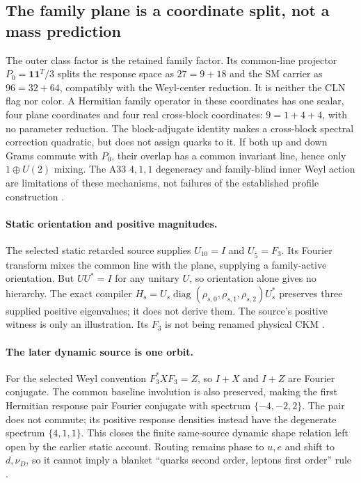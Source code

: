 \documentclass[11pt]{article}
\begin{document}
\subsection{The family plane is a coordinate split, not a mass prediction}
\label{sec:fsb04c}
The outer class factor is the retained family factor. Its common-line
projector $P_0=\mathbf1\mathbf1^T/3$ splits the response space as $27=9+18$
and the SM carrier as $96=32+64$, compatibly with the Weyl-center reduction.
It is neither the CLN flag nor color. A Hermitian family operator in these
coordinates has one scalar, four plane coordinates and four real cross-block
coordinates: $9=1+4+4$, with no parameter reduction. The block-adjugate
identity makes a cross-block spectral correction quadratic, but does not
assign quarks to it. If both up and down Grams commute with $P_0$, their
overlap has a common invariant line, hence only $1\oplus U(2)$ mixing. The
A33 $4,1,1$ degeneracy and family-blind inner Weyl action are limitations of
these mechanisms, not failures of the established profile construction
\cite{FSB04c}.

\paragraph{Static orientation and positive magnitudes.}\label{sec:fsb04d}
The selected static retarded source supplies $U_{10}=I$ and
$U_{\overline5}=F_3$. Its Fourier transform mixes the common line with the
plane, supplying a family-active orientation. But $UU^*=I$ for any unitary
$U$, so orientation alone gives no hierarchy. The exact compiler
$H_s=U_s\operatorname{diag}(\rho_{s,0},\rho_{s,1},\rho_{s,2})U_s^*$
preserves three supplied positive eigenvalues; it does not derive them. The
source's positive witness is only an illustration. Its $F_3$ is not being
renamed physical CKM \cite{FSB04d}.

\paragraph{The later dynamic source is one orbit.}\label{sec:fsb04e}
For the selected Weyl convention $F_3^*XF_3=Z$, so $I+X$ and $I+Z$ are
Fourier conjugate. The common baseline involution is also preserved, making
the first Hermitian response pair Fourier conjugate with spectrum
$\{-4,-2,2\}$. The pair does not commute; its positive response densities
instead have the degenerate spectrum $\{4,1,1\}$. This closes the finite
same-source dynamic shape relation left open by the earlier static account.
Routing remains phase to $u,e$ and shift to $d,\nu_D$, so it cannot imply
a blanket ``quarks second order, leptons first order'' rule \cite{FSB04e}.
\end{document}
